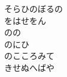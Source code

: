 \documentclass[10pt,b5j]{tarticle} %
\begin{document}
\begin{enumerate}
\begin{minipage}[c]{\blocksize}
        \vspace{\linespace}
        \item
        そらひのぼるの\\
        をはせをん\\
        のの\\
        のにひ\\
        のこころみて\\
        きせぬへばや
    
    \end{minipage}
\end{enumerate} %
\end{document}
